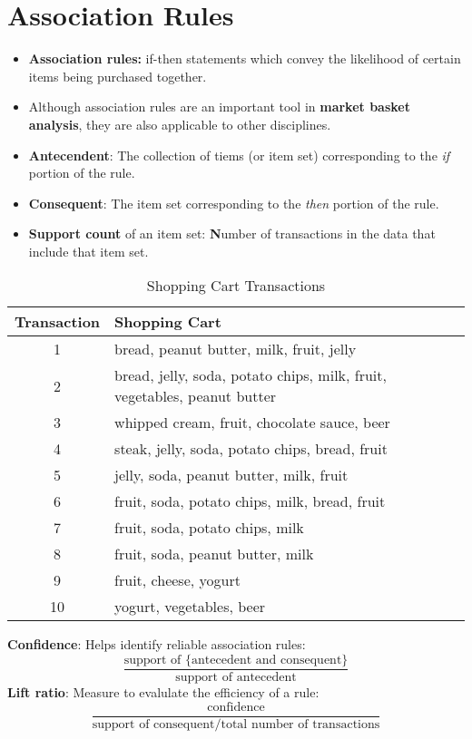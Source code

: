 \documentclass{report}
\begin{document}
\section{Association Rules}
\begin{itemize}
  \item \textbf{Association rules:} if-then statements which convey the likelihood of certain items being purchased together.
  \item Although association rules are an important tool in \textbf{market basket analysis}, they are also applicable to other disciplines.
  \item \textbf{Antecendent}: The collection of tiems (or item set) corresponding to the \textit{if} portion of the rule.
  \item \textbf{Consequent}: The item set corresponding to the \textit{then} portion of the rule.
  \item \textbf{Support count} of an item set: \textbf{N}umber of transactions in the data that include that item set.
\end{itemize}
\clearpage
\begin{table}[h]
\centering
\caption{Shopping Cart Transactions}
\begin{tabular}{cl}
\toprule
Transaction & Shopping Cart \\
\midrule
1 & bread, peanut butter, milk, fruit, jelly \\
2 & bread, jelly, soda, potato chips, milk, fruit, vegetables, peanut butter \\
3 & whipped cream, fruit, chocolate sauce, beer \\
4 & steak, jelly, soda, potato chips, bread, fruit \\
5 & jelly, soda, peanut butter, milk, fruit \\
6 & fruit, soda, potato chips, milk, bread, fruit \\
7 & fruit, soda, potato chips, milk \\
8 & fruit, soda, peanut butter, milk \\
9 & fruit, cheese, yogurt \\
10 & yogurt, vegetables, beer \\
\bottomrule
\end{tabular}
\end{table}
\noindent
\textbf{Confidence}: Helps identify reliable association rules:
$$ \frac{\text{support of \{antecedent and consequent\}}}{\text{support of antecedent}}$$
\textbf{Lift ratio}: Measure to evalulate the efficiency of a rule:
$$ \frac{\text{confidence}}{\text{support of consequent/total number of transactions}}$$
\end{document}
